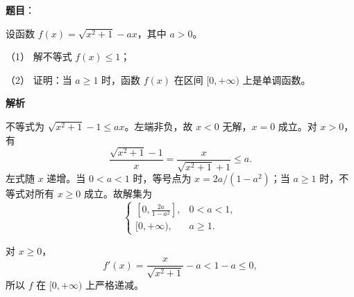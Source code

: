 \begin{answer}

\textbf{题目}：

设函数 $f(x)=\sqrt{x^2+1}-ax$，其中 $a>0$。

（1） 解不等式 $f(x)\leq 1$；

（2） 证明：当 $a\geq1$ 时，函数 $f(x)$ 在区间 $[0,+\infty)$ 上是单调函数。

\textbf{解析}


不等式为 $\sqrt{x^2+1}-1\le ax$。左端非负，故 $x<0$ 无解，$x=0$ 成立。对 $x>0$，有
\nopagebreak[4]
\[
\frac{\sqrt{x^2+1}-1}{x}=\frac{x}{\sqrt{x^2+1}+1}\le a.
\]
左式随 $x$ 递增。当 $0<a<1$ 时，等号点为 $x=2a/(1-a^2)$；当 $a\ge1$ 时，不等式对所有 $x\ge0$ 成立。故解集为
\nopagebreak[4]
\[
\begin{cases}[0,\frac{2a}{1-a^2}],&0<a<1,\\[3pt][0,+\infty),&a\ge1.\end{cases}
\]


对 $x\ge0$，
\nopagebreak[4]
\[
f'(x)=\frac{x}{\sqrt{x^2+1}}-a<1-a\le0,
\]
所以 $f$ 在 $[0,+\infty)$ 上严格递减。

\gkanswer{答案（1）：$0<a<1$ 时 $[0,2a/(1-a^2)]$；$a\ge1$ 时 $[0,+\infty)$}

\gkanswer{答案（2）：$f$ 在 $[0,+\infty)$ 上严格递减}

\end{answer}
